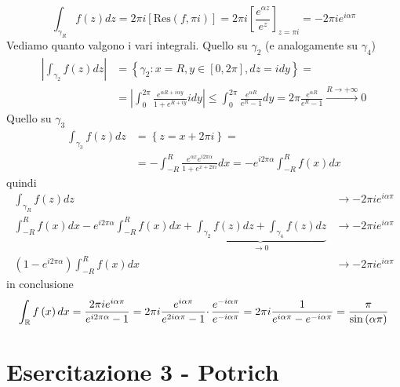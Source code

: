 \FloatBarrier

\begin{equation*}
\int _{\gamma _{R}} f\left( z\right) dz=2\pi i\left[\mathrm{Res}\left( f,\pi i\right)\right] =2\pi i\left[\frac{e^{\alpha z}}{e^{z}}\right]_{z=\pi i} =-2\pi ie^{i\alpha \pi }
\end{equation*}
Vediamo quanto valgono i vari integrali. Quello su $\gamma _{2}$ (e analogamente su $\gamma _{4}$)
\begin{align*}
\left| \int _{\gamma _{2}} f\left( z\right) dz\right|  & =\left\{\gamma _{2} :x=R,y\in \left[ 0,2\pi \right] ,dz=idy\right\} =\\
 & =\left| \int ^{2\pi }_{0}\frac{e^{\alpha R+i\alpha y}}{1+e^{R+iy}} idy\right| \leqslant \int ^{2\pi }_{0}\frac{e^{\alpha R}}{e^{R} -1} dy=2\pi \frac{e^{\alpha R}}{e^{R} -1}\xrightarrow{R\rightarrow +\infty } 0
\end{align*}
Quello su $\gamma _{3}$
\begin{align*}
\int _{\gamma _{3}} f\left( z\right) dz & =\left\{z=x+2\pi i\right\} =\\
 & =-\int ^{R}_{-R}\frac{e^{\alpha x} e^{i2\pi \alpha }}{1+e^{x+2\pi i}} dx=-e^{i2\pi \alpha }\int ^{R}_{-R} f\left( x\right) dx
\end{align*}
quindi
\begin{align*}
\int _{\gamma _{R}} f\left( z\right) dz & \rightarrow -2\pi ie^{i\alpha \pi }\\
\int ^{R}_{-R} f\left( x\right) dx-e^{i2\pi \alpha }\int ^{R}_{-R} f\left( x\right) dx+\underbrace{\int _{\gamma _{2}} f\left( z\right) dz+\int _{\gamma _{4}} f\left( z\right) dz}_{\rightarrow 0} & \rightarrow -2\pi ie^{i\alpha \pi }\\
\left( 1-e^{i2\pi \alpha }\right)\int ^{R}_{-R} f\left( x\right) dx & \rightarrow -2\pi ie^{i\alpha \pi }
\end{align*}
in conclusione
\begin{equation*}
\int _{\mathbb{R} } f\left( x\right) dx=\frac{2\pi ie^{i\alpha \pi }}{e^{i2\pi \alpha } -1} =2\pi i\frac{e^{i\alpha \pi }}{e^{2i\alpha \pi } -1} \cdotp \frac{e^{-i\alpha \pi }}{e^{-i\alpha \pi }} =2\pi i\frac{1}{e^{i\alpha \pi } -e^{-i\alpha \pi }} =\frac{\pi }{\sin\left( \alpha \pi \right)}
\end{equation*}
\chapter{Esercitazione 3 - Potrich}
\ParteEsercizi
\Esercizio{}

